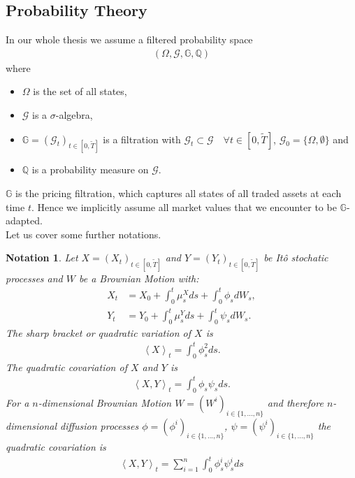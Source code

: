 \documentclass[12pt]{article}
\newtheorem{notation}[theorem]{Notation}
\begin{document}
	\subsection{Probability Theory}
	In our whole thesis we assume a filtered probability space
	\begin{align*}
		(\Omega, \mathcal{G}, \mathbb{G}, \mathbb{Q})
	\end{align*}
	where
	\begin{itemize}
		\item $\Omega$ is the set of all states,
		\item $\mathcal{G}$ is a $\sigma$-algebra,
		\item $\mathbb{G} = (\mathcal{G}_t)_{t \in \left[0,\tilde{T}\right]}$ is a filtration with $\mathcal{G}_t \subset \mathcal{G} \quad \forall t \in [0,\tilde{T}]$, $\mathcal{G}_0 = \{\Omega, \emptyset \}$ and
		\item $\mathbb{Q}$ is a probability measure on $\mathcal{G}$.
	\end{itemize}
	$\mathbb{G}$ is the pricing filtration, which captures all states of all traded assets at each time $t$. Hence we implicitly assume all market values that we encounter to be $\mathbb{G}$-adapted.\\
	Let us cover some further notations.
	\begin{notation}
		Let $X=(X_t)_{t\in \left[0,\tilde{T}\right]}$ and $Y=(Y_t)_{t\in \left[0,\tilde{T}\right]}$ be Itô stochatic processes and $W$ be a Brownian Motion with:
		\begin{align*}
			X_t &= X_0 + \int_{0}^{t}\mu^X_s ds + \int_{0}^{t}\phi_s dW_s, \\
			Y_t &= Y_0 + \int_{0}^{t}\mu^Y_s ds + \int_{0}^{t}\psi_s dW_s.
		\end{align*}
		The \emph{sharp bracket} or \emph{quadratic variation} of $X$ is 
		\begin{align*}
			\left\langle X \right\rangle_t = \int_{0}^{t}\phi_s^2 ds.
		\end{align*}
		The \emph{quadratic covariation} of $X$ and $Y$ is 
		\begin{align*}
			\left\langle X, Y \right\rangle_t = \int_{0}^{t}\phi_s \psi_s ds.
		\end{align*}
		For a $n$-dimensional Brownian Motion $W = (W^i)_{i\in\{1,...,n\}}$ and therefore $n$-dimensional diffusion processes $\phi=(\phi^i)_{i \in \{1,..., n\}}$, $\psi=(\psi^i)_{i \in \{1,..., n\}}$ the quadratic covariation is
		\begin{align*}
			\left\langle X, Y \right\rangle_t = \sum_{i=1}^{n} \int_{0}^{t} \phi^i_s \psi^i_s ds
		\end{align*}
	\end{notation}
\end{document}
